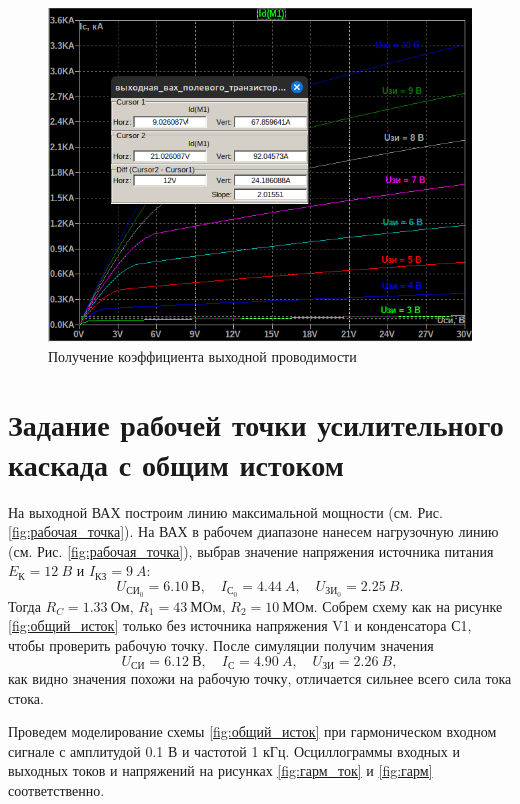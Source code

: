 \begin{figure}[H]
    \centering
    \includegraphics[width=0.8\linewidth]{figs/получение_G.png}
    \caption{Получение коэффициента выходной проводимости}
    \label{fig:коэффициент_выходной_проводимости}
\end{figure}



\section*{Задание рабочей точки усилительного каскада с общим
истоком}

На выходной ВАХ построим линию максимальной мощности (см. Рис. \ref{fig:рабочая_точка}).
На ВАХ в рабочем диапазоне нанесем нагрузочную линию (см. Рис. \ref{fig:рабочая_точка}),
выбрав значение напряжения источника питания $E_\text{К}=12\ B$ и $I_\text{КЗ}=9\ A$:
\begin{equation*}
    U_{\text{СИ}_0}=6.10\ \text{В},\quad I_{\text{С}_0}=4.44\ A,\quad U_{\text{ЗИ}_0}=2.25\ B.
\end{equation*}
Тогда $R_C=1.33\ \text{Ом}$, $R_1=43\ \text{МОм}$, $R_2=10\ \text{МОм}$. Собрем
схему как на рисунке \ref{fig:общий_исток} только без источника напряжения V1 и
конденсатора С1, чтобы проверить рабочую точку. После симуляции получим значения
\begin{equation*}
    U_{\text{СИ}}=6.12\ \text{В},\quad I_{\text{С}}=4.90\ A,\quad U_{\text{ЗИ}}=2.26\ B,
\end{equation*}
как видно значения похожи на рабочую точку, отличается сильнее всего сила тока
стока.

Проведем моделирование схемы \ref{fig:общий_исток} при гармоническом
входном сигнале с амплитудой 0.1 В и частотой 1 кГц. Осциллограммы входных и выходных токов и
напряжений на рисунках \ref{fig:гарм_ток} и \ref{fig:гарм} соответственно.


